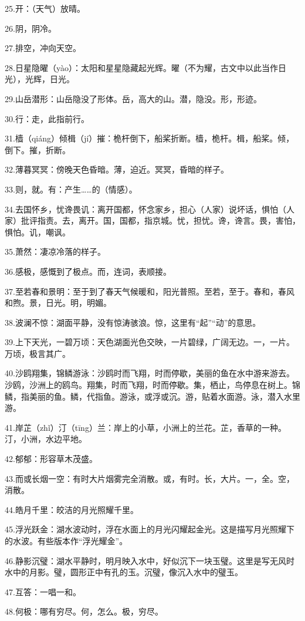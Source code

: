 \documentclass[letterpaper,12pt,english]{sphinxmanual}
\begin{document}
25.开：（天气）放晴。

26.阴，阴冷。

27.排空，冲向天空。

28.日星隐曜（yào）：太阳和星星隐藏起光辉。曜（不为耀，古文中以此当作日光），光辉，日光。

29.山岳潜形：山岳隐没了形体。岳，高大的山。潜，隐没。形，形迹。

30.行：走，此指前行。

31.樯（qiáng）倾楫（jí）摧：桅杆倒下，船桨折断。樯，桅杆。楫，船桨。倾，倒下。摧，折断。

32.薄暮冥冥：傍晚天色昏暗。薄，迫近。冥冥，昏暗的样子。

33.则，就。有：产生……的（情感）。

34.去国怀乡，忧谗畏讥：离开国都，怀念家乡，担心（人家）说坏话，惧怕（人家）批评指责。去，离开。国，国都，指京城。忧，担忧。谗，谗言。畏，害怕，惧怕。讥，嘲讽。

35.萧然：凄凉冷落的样子。

36.感极，感慨到了极点。而，连词，表顺接。

37.至若春和景明：至于到了春天气候暖和，阳光普照。至若，至于。春和，春风和煦。景，日光。明，明媚。

38.波澜不惊：湖面平静，没有惊涛骇浪。惊，这里有“起”“动”的意思。

39.上下天光，一碧万顷：天色湖面光色交映，一片碧绿，广阔无边。一，一片。万顷，极言其广。

40.沙鸥翔集，锦鳞游泳：沙鸥时而飞翔，时而停歇，美丽的鱼在水中游来游去。沙鸥，沙洲上的鸥鸟。翔集，时而飞翔，时而停歇。集，栖止，鸟停息在树上。锦鳞，指美丽的鱼。鳞，代指鱼。游泳，或浮或沉。游，贴着水面游。泳，潜入水里游。

41.岸芷（zhǐ）汀（tīng）兰：岸上的小草，小洲上的兰花。芷，香草的一种。汀，小洲，水边平地。

42.郁郁：形容草木茂盛。

43.而或长烟一空：有时大片烟雾完全消散。或，有时。长，大片。一，全。空，消散。

44.皓月千里：皎洁的月光照耀千里。

45.浮光跃金：湖水波动时，浮在水面上的月光闪耀起金光。这是描写月光照耀下的水波。有些版本作“浮光耀金”。

46.静影沉璧：湖水平静时，明月映入水中，好似沉下一块玉璧。这里是写无风时水中的月影。璧，圆形正中有孔的玉。沉璧，像沉入水中的璧玉。

47.互答：一唱一和。

48.何极：哪有穷尽。何，怎么。极，穷尽。
\end{document}
